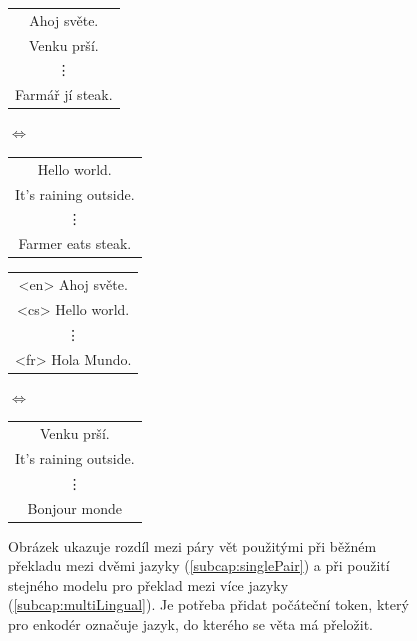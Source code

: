 \begin{figure}[H]        
    \begin{center}
        \begin{tabular}{|c|}
          \hline
          Ahoj světe. \\
          Venku prší. \\
          \vdots \\
          Farmář jí steak. \\
          \hline
        \end{tabular}
        $\Longleftrightarrow$
        \begin{tabular}{|c|}
          \hline
          Hello world. \\
          It's raining outside. \\
          \vdots \\
          Farmer eats steak. \\
          \hline
        \end{tabular}
    \end{center}
    \begin{minipage}[t]{1\linewidth}
        \centering
        \label{subcap:singlePair}
    \end{minipage}%
    
    \begin{center}
        \begin{tabular}{|c|}
          \hline
          <en> Ahoj světe. \\
          <cs> Hello world. \\
          \vdots \\
          <fr> Hola Mundo. \\
          \hline
        \end{tabular}
        $\Longleftrightarrow$
        \begin{tabular}{|c|}
          \hline
          Venku prší. \\
          It's raining outside. \\
          \vdots \\
          Bonjour monde \\
          \hline
        \end{tabular}
    \end{center}    
    \begin{minipage}[t]{1\linewidth}
        \centering
        \label{subcap:multiLingual}
    \end{minipage}%
   
	\caption{Obrázek ukazuje rozdíl mezi páry vět použitými při běžném překladu mezi dvěmi jazyky (\ref{subcap:singlePair}) a při použití stejného modelu pro překlad mezi více jazyky (\ref{subcap:multiLingual}). Je potřeba přidat počáteční token, který pro enkodér označuje jazyk, do kterého se věta má přeložit.}
	\label{figure:multiLingDataset}
\end{figure}

